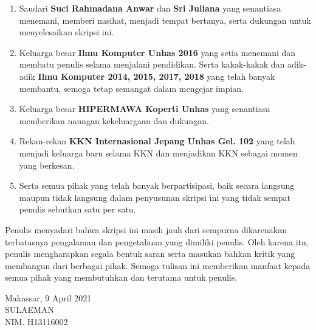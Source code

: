 \begin{enumerate}[topsep=0pt,itemsep=0pt,partopsep=0pt, parsep=0pt]
    \item Saudari \textbf{Suci Rahmadana Anwar} dan \textbf{Sri Juliana} yang senantiasa menemani, memberi nasihat, menjadi tempat bertanya, serta dukungan untuk menyelesaikan skripsi ini.

    \item Keluarga besar \textbf{Ilmu Komputer Unhas 2016} yang setia menemani dan membatu penulis selama menjalani pendidikan. Serta kakak-kakak dan adik-adik \textbf{Ilmu Komputer 2014, 2015, 2017, 2018} yang telah banyak membantu, semoga tetap semangat dalam mengejar impian.

    \item Keluarga besar \textbf{HIPERMAWA Koperti Unhas} yang senantiasa memberikan naungan kekeluargaan dan dukungan.

    \item Rekan-rekan \textbf{KKN Internasional Jepang Unhas Gel. 102} yang telah menjadi keluarga baru selama KKN dan menjadikan KKN sebagai momen yang berkesan.

    \item Serta semua pihak yang telah banyak berpartisipasi, baik secara langsung maupun tidak langsung dalam penyusunan skripsi ini yang tidak sempat penulis sebutkan satu per satu.
\end{enumerate}

Penulis menyadari bahwa skripsi ini masih jauh dari sempurna dikarenakan terbatasnya pengalaman dan pengetahuan yang dimiliki penulis. Oleh karena itu, penulis mengharapkan segala bentuk saran serta masukan bahkan kritik yang membangun dari berbagai pihak. Semoga tulisan ini memberikan manfaat kepada semua pihak yang membutuhkan dan terutama untuk penulis.

\vspace{1cm}
\begin{flushright}
    Makassar, 9 April 2021\\
    \vspace{2.5cm}
    {SULAEMAN}\\
    NIM. {H13116002}
\end{flushright}


